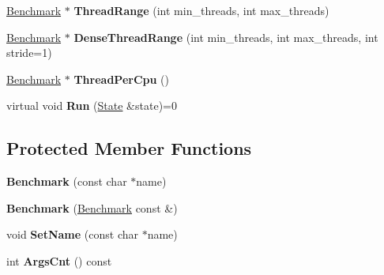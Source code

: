 \begin{DoxyCompactItemize}
\mbox{\hyperlink{classbenchmark_1_1internal_1_1_benchmark}{Benchmark}} $\ast$ {\bfseries Thread\+Range} (int min\+\_\+threads, int max\+\_\+threads)
\item 
\mbox{\label{classbenchmark_1_1internal_1_1_benchmark_a6c1742c840892844c87d910125d1b8b9}} 
\mbox{\hyperlink{classbenchmark_1_1internal_1_1_benchmark}{Benchmark}} $\ast$ {\bfseries Dense\+Thread\+Range} (int min\+\_\+threads, int max\+\_\+threads, int stride=1)
\item 
\mbox{\label{classbenchmark_1_1internal_1_1_benchmark_a1cd0207050adaf282f841611d44c2d02}} 
\mbox{\hyperlink{classbenchmark_1_1internal_1_1_benchmark}{Benchmark}} $\ast$ {\bfseries Thread\+Per\+Cpu} ()
\item 
\mbox{\label{classbenchmark_1_1internal_1_1_benchmark_abad572c7d962a8b626829992cab23366}} 
virtual void {\bfseries Run} (\mbox{\hyperlink{classbenchmark_1_1_state}{State}} \&state)=0
\end{DoxyCompactItemize}
\subsection*{Protected Member Functions}
\begin{DoxyCompactItemize}
\item 
\mbox{\label{classbenchmark_1_1internal_1_1_benchmark_addc9d155cbd6d9003a2dae38392c6a4e}} 
{\bfseries Benchmark} (const char $\ast$name)
\item 
\mbox{\label{classbenchmark_1_1internal_1_1_benchmark_a17ebe7605da8da2891dd6d731db3fa37}} 
{\bfseries Benchmark} (\mbox{\hyperlink{classbenchmark_1_1internal_1_1_benchmark}{Benchmark}} const \&)
\item 
\mbox{\label{classbenchmark_1_1internal_1_1_benchmark_afb8069fa4e1b8b3933579438977fd585}} 
void {\bfseries Set\+Name} (const char $\ast$name)
\item 
\mbox{\label{classbenchmark_1_1internal_1_1_benchmark_a90ec48d73ba6886ae090c6bd48dd248d}} 
int {\bfseries Args\+Cnt} () const
\end{DoxyCompactItemize}
